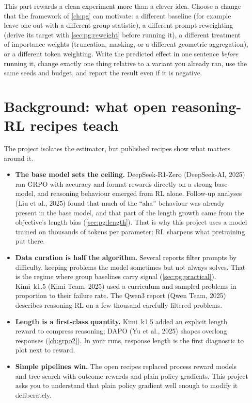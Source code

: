 This part rewards a clean experiment more than a clever idea. Choose a change that the framework of
\cref{ch:pg} can motivate: a different baseline (for example leave-one-out with a different group
statistic), a different prompt reweighting (derive its target with \cref{sec:pg:reweight} before
running it), a different treatment of importance weights (truncation, masking, or a different
geometric aggregation), or a different token weighting. Write the predicted effect in one sentence
\emph{before} running it, change exactly one thing relative to a variant you already ran, use the
same seeds and budget, and report the result even if it is negative.

\section{Background: what open reasoning-RL recipes teach}\label{sec:proj5:cases}

The project isolates the estimator, but published recipes show what matters around it.
\begin{itemize}
\item \textbf{The base model sets the ceiling.} DeepSeek-R1-Zero (DeepSeek-AI, 2025) ran GRPO with
  accuracy and format rewards directly on a strong base model, and reasoning behaviour emerged from RL
  alone. Follow-up analyses (Liu et al., 2025) found that much of the ``aha'' behaviour was already
  present in the base model, and that part of the length growth came from the objective's length bias
  (\cref{sec:pg:length}). That is why this project uses a model trained on thousands of tokens per
  parameter: RL sharpens what pretraining put there.
\item \textbf{Data curation is half the algorithm.} Several reports filter prompts by difficulty,
  keeping problems the model sometimes but not always solves. That is the regime where group
  baselines carry signal (\cref{sec:pg:practical}). Kimi~k1.5 (Kimi Team, 2025) used a curriculum and
  sampled problems in proportion to their failure rate. The Qwen3 report (Qwen Team, 2025) describes
  reasoning RL on a few thousand carefully filtered problems.
\item \textbf{Length is a first-class quantity.} Kimi~k1.5 added an explicit length reward to compress
  reasoning; DAPO (Yu et al., 2025) shapes overlong responses (\cref{ch:grpo2}). In your runs, response
  length is the first diagnostic to plot next to reward.
\item \textbf{Simple pipelines win.} The open recipes replaced process reward models and tree search
  with outcome rewards and plain policy gradients. This project asks you to understand that plain
  policy gradient well enough to modify it deliberately.
\end{itemize}

